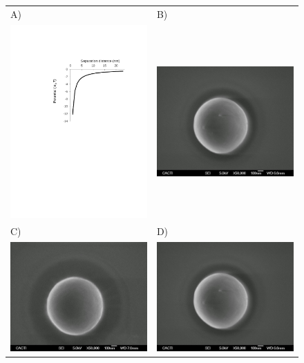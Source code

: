\documentclass[journal=langd5,manuscript=article]{achemso}
\begin{document}
 \begin{figure}
 \begin{tabular}{|l|l|}
 \hline
  A) & B)\\
  \includegraphics[width=0.49\linewidth]
  {Figures/HA_MS_Laura_DLVO.pdf} & \includegraphics[width=0.49\linewidth]{Figures/5-063.jpg}\\
 \hline 
  C) & D)\\
  \includegraphics[width=0.49\linewidth]
  {Figures/4-052.jpg} & \includegraphics[width=0.49\linewidth]{Figures/5-063.jpg}\\

\end{tabular}
\end{figure}
\end{document}
